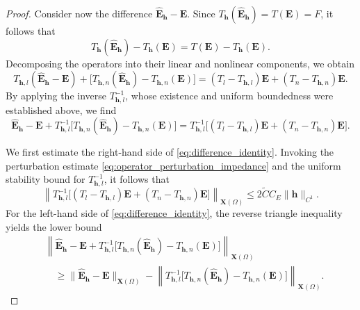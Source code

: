 \documentclass[10pt,a4paper]{amsart}
\numberwithin{equation}{section}
\begin{document}
\begin{proof}
Consider now the difference $\hat{\mathbf E}_{\mathbf h} - \mathbf E$. Since $T_{\mathbf h}(\hat{\mathbf E}_{\mathbf h}) = T(\mathbf E) =  F$, it follows that
\[
T_{\mathbf h}(\hat{\mathbf E}_{\mathbf h}) - T_{\mathbf h}(\mathbf E) = T(\mathbf E) - T_{\mathbf h}(\mathbf E).
\]
Decomposing the operators into their linear and nonlinear components, we obtain
\[
T_{\mathbf h,l}(\hat{\mathbf E}_{\mathbf h} - \mathbf E) + \big[ T_{\mathbf h,n}(\hat{\mathbf E}_{\mathbf h}) - T_{\mathbf h,n}(\mathbf E) \big] = (T_l - T_{\mathbf h,l})\mathbf E + (T_n - T_{\mathbf h,n})\mathbf E.
\]
By applying the inverse $T_{\mathbf h,l}^{-1}$, whose existence and uniform boundedness were established above, we find
\begin{equation}\label{eq:difference_identity}
\hat{\mathbf E}_{\mathbf h} - \mathbf E + T_{\mathbf h,l}^{-1} \big[ T_{\mathbf h,n}(\hat{\mathbf E}_{\mathbf h}) - T_{\mathbf h,n}(\mathbf E) \big] = T_{\mathbf h,l}^{-1} \big[ (T_l - T_{\mathbf h,l})\mathbf E + (T_n - T_{\mathbf h,n})\mathbf E \big].
\end{equation}

We first estimate the right-hand side of \eqref{eq:difference_identity}. Invoking the perturbation estimate \eqref{eq:operator_perturbation_impedance} and the uniform stability bound for $T_{\mathbf h,l}^{-1}$, it follows that
\[
\left\| T_{\mathbf h,l}^{-1} \big[ (T_l - T_{\mathbf h,l})\mathbf E + (T_n - T_{\mathbf h,n})\mathbf E \big] \right\|_{\mathbf X(\Omega)} \le 2\widetilde{C} C_E \|\mathbf h\|_{C^1}.
\]
For the left-hand side of \eqref{eq:difference_identity}, the reverse triangle inequality yields the lower bound
\[
\begin{aligned}
&\left\| \hat{\mathbf E}_{\mathbf h} - \mathbf E + T_{\mathbf h,l}^{-1} \big[ T_{\mathbf h,n}(\hat{\mathbf E}_{\mathbf h}) - T_{\mathbf h,n}(\mathbf E) \big] \right\|_{\mathbf X(\Omega)} \\
&\quad \ge \|\hat{\mathbf E}_{\mathbf h} - \mathbf E\|_{\mathbf X(\Omega)} - \left\| T_{\mathbf h,l}^{-1} \big[ T_{\mathbf h,n}(\hat{\mathbf E}_{\mathbf h}) - T_{\mathbf h,n}(\mathbf E) \big] \right\|_{\mathbf X(\Omega)}.
\end{aligned}
\]



\end{proof}
\end{document}
